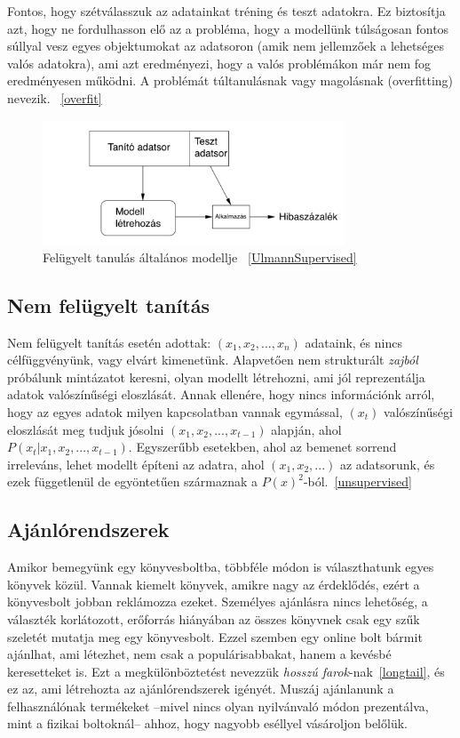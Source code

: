 \documentclass[a4paper,12pt]{article}
\begin{document}
Fontos, hogy szétválasszuk az adatainkat tréning és teszt adatokra. Ez biztosítja azt, hogy ne fordulhasson elő az a probléma, hogy a modellünk túlságosan fontos súllyal vesz egyes objektumokat az adatsoron (amik nem jellemzőek a lehetséges valós adatokra), ami azt eredményezi, hogy a valós problémákon már nem fog eredményesen működni. A problémát túltanulásnak vagy magolásnak (overfitting) nevezik. ~\ref{overfit}


\begin{figure}[ht!]
\centering
\includegraphics[width=90mm]{img/ml.png}
\caption{Felügyelt tanulás általános modellje ~\ref{UlmannSupervised} \label{ml}}
\end{figure}

\subsection{Nem felügyelt tanítás}
Nem felügyelt tanítás esetén adottak: $(x_1, x_2, ..., x_n)$ adataink, és nincs célfüggvényünk, vagy elvárt kimenetünk. Alapvetően nem strukturált \textsl{zajból} próbálunk mintázatot keresni, olyan modellt létrehozni, ami jól reprezentálja adatok valószínűségi eloszlását. Annak ellenére, hogy nincs információnk arról, hogy az egyes adatok milyen kapcsolatban vannak egymással, $(x_t)$ valószínűségi eloszlását meg tudjuk jósolni  $(x_1,x_2, ..., x_{t-1})$ alapján, ahol $P(x_t|x_1,x_2, ..., x_{t-1})$.
Egyszerűbb esetekben, ahol az bemenet sorrend irreleváns, lehet modellt építeni az adatra, ahol $(x_1, x_2, ...)$ az adatsorunk, és ezek függetlenül de egyöntetűen származnak a $P(x)^2$-ból.~\ref{unsupervised}

\subsection{Ajánlórendszerek}
Amikor bemegyünk egy könyvesboltba, többféle módon is választhatunk egyes könyvek közül. Vannak kiemelt könyvek, amikre nagy az érdeklődés, ezért a könyvesbolt jobban reklámozza ezeket. Személyes ajánlásra nincs lehetőség, a választék korlátozott, erőforrás hiányában az összes könyvnek csak egy szűk szeletét mutatja meg egy könyvesbolt. Ezzel szemben egy online bolt bármit ajánlhat, ami létezhet, nem csak a populárisabbakat, hanem a kevésbé keresetteket is. Ezt a megkülönböztetést nevezzük \textsl{hosszú farok}-nak~\ref{longtail}, és ez az, ami létrehozta az ajánlórendszerek igényét. Muszáj ajánlanunk a felhasználónak termékeket --mivel nincs olyan nyilvánvaló módon prezentálva, mint a fizikai boltoknál-- ahhoz, hogy nagyobb eséllyel vásároljon belőlük. \linebreak
\end{document}
